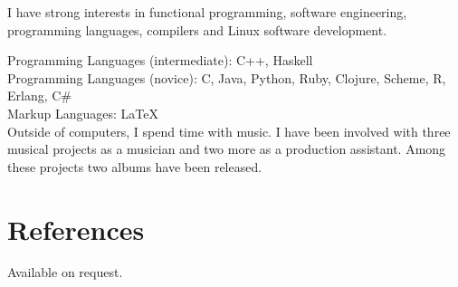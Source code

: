 \documentclass[margintitle,line]{res}
\begin{document}
\begin{resume}
I have strong interests in functional programming, software engineering, programming languages, compilers and Linux software development. 

Programming Languages (intermediate): C++, Haskell \\
Programming Languages (novice): C, Java, Python, Ruby, Clojure, Scheme, R, Erlang, C\# \\
Markup Languages: LaTeX \\

Outside of computers, I spend time with music. I have been involved with three musical projects as a musician and two more as a production assistant. Among these projects two albums have been released. 




\section{References}

Available on request.

\end{resume}
\end{document}

